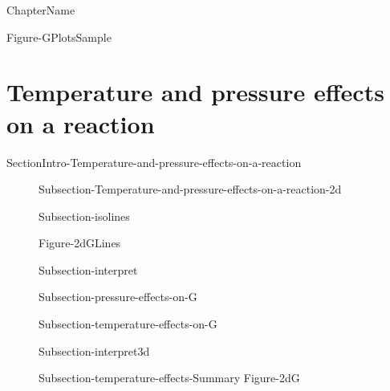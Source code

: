 \documentclass[main.tex]{subfiles}
\begin{document}
\newcommand\chapterlabel{Ch-thermo}\setcounter{figurenewcounter}{0}\setcounter{tablenewcounter}{0}\setcounter{formulanewcounter}{0}\chapterpicture{../\chapterlabel/figure1}
\setcounter{figurenewcounter}{0}



  
 \setcounter{chapter}{6} {ChapterName} 



 
\hspace{4cm} \begin{center}{Figure-GPlotsSample}\end{center}
\begin{marginfigure}[0cm]\usetikzlibrary {shapes.symbols}\end{marginfigure}
\section{Temperature and pressure effects on a reaction}{SectionIntro-Temperature-and-pressure-effects-on-a-reaction}
\sloppy\begin{description}
\item[] {Subsection-Temperature-and-pressure-effects-on-a-reaction-2d}
\item[] {Subsection-isolines}
\hspace{4cm} \begin{center}{Figure-2dGLines}\end{center}
\item[] {Subsection-interpret}
\item[] {Subsection-pressure-effects-on-G}
\item[] {Subsection-temperature-effects-on-G}
\item[] {Subsection-interpret3d}
\item[] {Subsection-temperature-effects-Summary}
\newpage
\hspace{-6cm}
{Figure-2dG}
 \end{description}







\checkoddpage\ifoddpage \clearpage\thispagestyle{empty}\mbox{}\clearpage \else  \fi 
\end{document}
